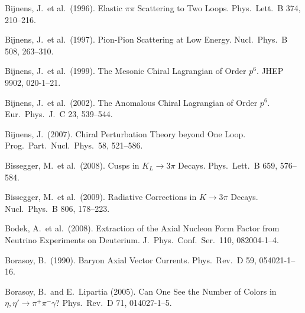 \documentclass[twoside,12pt]{article}
\begin{document}
\begin{thebibliography}{}
Bijnens, J.~et al.~(1996).
Elastic $\pi\pi$ Scattering to Two Loops.
Phys.\ Lett.\  B 374, 210--216.

Bijnens, J.~et al.~(1997).
Pion-Pion Scattering at Low Energy.
Nucl.\ Phys.\  B 508, 263--310.

Bijnens, J.~et al.~(1999).
The Mesonic Chiral Lagrangian of Order $p^6$.
JHEP 9902, 020-1--21.

Bijnens, J.~et al.~(2002).
The Anomalous Chiral Lagrangian of Order $p^6$.
Eur.\ Phys.\ J.\  C 23, 539--544.

Bijnens, J.~(2007).
Chiral Perturbation Theory beyond One Loop.
Prog.\ Part.\ Nucl.\ Phys.\ 58, 521--586.

Bissegger, M.~et al.~(2008).
Cusps in $K_L\to 3 \pi$ Decays.
Phys.\ Lett.\  B 659, 576--584.

Bissegger, M.~et al.~(2009).
Radiative Corrections in $K\to 3 \pi$ Decays.
Nucl.\ Phys.\  B 806, 178--223.

Bodek, A.~et al.~(2008).
Extraction of the Axial Nucleon Form Factor from Neutrino Experiments on
Deuterium.
J.\ Phys.\ Conf.\ Ser.\ 110, 082004-1--4.

Borasoy, B.~(1990).
Baryon Axial Vector Currents.
Phys.\ Rev.\ D 59, 054021-1--16.

Borasoy, B.~and E.~Lipartia (2005).
Can One See the Number of Colors in $\eta, \eta' \to\pi^+ \pi^- \gamma$?
Phys.\ Rev.\  D 71, 014027-1--5.


\end{thebibliography}
\end{document}
